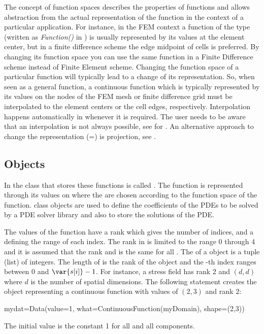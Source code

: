 The concept of function spaces describes the properties of functions and
allows abstraction from the actual representation of the function in the
context of a particular application. For instance, in the FEM context a
function of the \Function type (written as \emph{Function()} in )
is usually represented by its values at the element center,
but in a finite difference scheme the edge midpoint of cells is preferred.
By changing its function space you can use the same function in a Finite
Difference scheme instead of Finite Element scheme.
Changing the function space of a particular function will typically lead to
a change of its representation.
So, when seen as a general function, a continuous function which is typically
represented by its values on the nodes of the FEM mesh or finite difference
grid must be interpolated to the element centers or the cell edges,
respectively. Interpolation happens automatically in \escript whenever it is
required. The user needs to be aware that an
interpolation is not always possible, see  for \finley.
An alternative approach to change the representation (=\FunctionSpace) is
projection, see .

\subsection{\Data Objects}
In \escript the class that stores these functions is called \Data.
The function is represented through its values on \DataSamplePoints where
the \DataSamplePoints are chosen according to the function space of the
function.
\Data class objects are used to define the coefficients of the PDEs to be
solved by a PDE solver library and also to store the solutions of the PDE.

The values of the function have a rank which gives the number of indices,
and a \Shape defining the range of each index.
The rank in \escript is limited to the range 0 through 4 and it is assumed
that the rank and \Shape is the same for all \DataSamplePoints.
The \Shape of a \Data object is a tuple (list)  of integers.
The length of  is the rank of the \Data object and the -th
index ranges between 0 and $\var{s[i]}-1$.
For instance, a stress field has rank 2 and \Shape $(d,d)$ where $d$ is the
number of spatial dimensions.
The following statement creates the \Data object  representing a
continuous function with values of \Shape $(2,3)$ and rank $2$:
\begin{python}
  mydat=Data(value=1, what=ContinuousFunction(myDomain), shape=(2,3))
\end{python}
The initial value is the constant 1 for all \DataSamplePoints and all
components.

